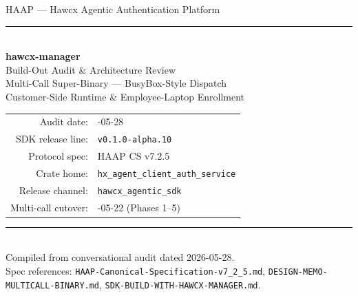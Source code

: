 \documentclass[11pt, a4paper]{article}
\newcommand{\code}[1]{\texttt{\small #1}}
\begin{document}

\begin{titlepage}
\centering
\vspace*{2cm}
{\color{hawcxmuted}\sffamily\large HAAP --- Hawcx Agentic Authentication Platform}\\[0.4cm]
{\color{hawcxborder}\rule{12cm}{0.5pt}}\\[1.0cm]
{\Huge\bfseries\sffamily\color{hawcxdark} hawcx-manager}\\[0.4cm]
{\LARGE\sffamily\color{hawcxblue} Build-Out Audit \& Architecture Review}\\[1.5cm]
{\large\sffamily Multi-Call Super-Binary --- BusyBox-Style Dispatch}\\[0.3cm]
{\large\sffamily Customer-Side Runtime \& Employee-Laptop Enrollment}\\[2.0cm]

\begin{tabular}{rl}
\sffamily\color{hawcxmuted}Audit date: & \sffamily 2026-05-28\\
\sffamily\color{hawcxmuted}SDK release line: & \sffamily \code{v0.1.0-alpha.10}\\
\sffamily\color{hawcxmuted}Protocol spec: & \sffamily HAAP CS v7.2.5\\
\sffamily\color{hawcxmuted}Crate home: & \sffamily \code{hx\_agent\_client\_auth\_service}\\
\sffamily\color{hawcxmuted}Release channel: & \sffamily \code{hawcx\_agentic\_sdk}\\
\sffamily\color{hawcxmuted}Multi-call cutover: & \sffamily 2026-05-22 (Phases 1--5)\\
\end{tabular}

\vfill
{\color{hawcxborder}\rule{12cm}{0.5pt}}\\[0.3cm]
{\sffamily\footnotesize\color{hawcxmuted}
Compiled from conversational audit dated 2026-05-28.\\
Spec references: \code{HAAP-Canonical-Specification-v7\_2\_5.md},
\code{DESIGN-MEMO-MULTICALL-BINARY.md},
\code{SDK-BUILD-WITH-HAWCX-MANAGER.md}.
}
\end{titlepage}

\tableofcontents
\listoffigures
\listoftables
\clearpage

\end{document}
